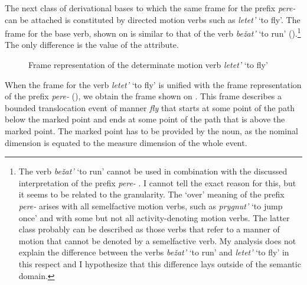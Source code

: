 The next class of derivational bases to which the same frame for the prefix \textit{pere-}   can be attached is constituted by directed motion verbs such as \textit{letet'} `to fly'. The frame for the base verb, shown on  is similar to that of the verb \textit{be\v{z}at'} `to run' ().\footnote{The verb \textit{be\v{z}at'} `to run' cannot be used in combination with the discussed interpretation of the prefix \textit{pere-}  . I cannot tell the exact reason for this, but it seems to be related to the granularity. The `over' meaning of the prefix \textit{pere-}   arises with all semelfactive   motion verbs, such as \textit{prygnut'} `to jump once' and with some but not all activity-denoting motion verbs. The latter class probably can be described as those verbs that refer to a manner of motion that cannot be denoted by a semelfactive   verb. My analysis does not explain the difference between the verbs \textit{be\v{z}at'} `to run' and \textit{letet'} `to fly' in this respect and I hypothesize that this difference lays outside of the semantic domain. } The only difference is the value of the \MANN attribute.

\begin{figure}
\centering
{}
\caption{Frame representation of the determinate motion verb \textit{letet'} `to fly' \label{frame:letet}}
\end{figure}

When the frame for the verb \textit{letet'} `to fly' is unified with the frame representation of the prefix \textit{pere-}   (), we obtain the frame shown on . This frame describes a bounded translocation  event of manner \textit{fly} that starts at some point of the path below the marked point and ends at some point of the path that is above the marked point. The marked point has to be provided by the noun, as the nominal dimension is equated to the measure dimension of the whole event. 


